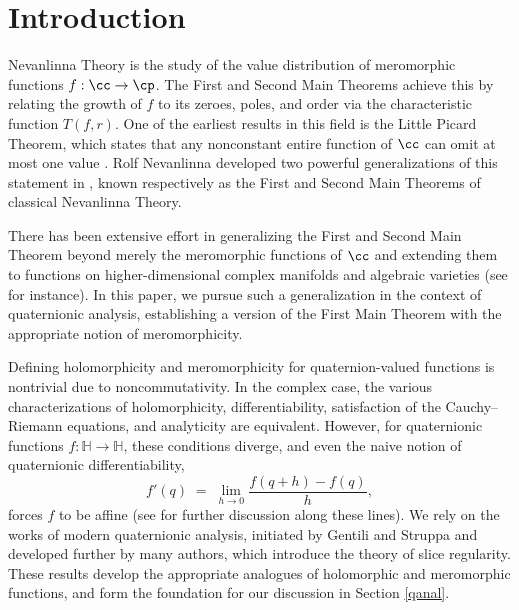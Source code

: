 \documentclass{amsart}
\begin{document}
\maketitle
\tableofcontents

\section{Introduction}

Nevanlinna Theory is the study of the value distribution of meromorphic functions $f:\cc\to\cp$. The First and Second Main Theorems achieve this by relating the growth of $f$ to its zeroes, poles, and order via the characteristic function $T(f,r)$. One of the earliest results in this field is the Little Picard Theorem, which states that any nonconstant entire function of $\cc$ can omit at most one value \cite{Picard1880}. Rolf Nevanlinna developed two powerful generalizations of this statement in \cite{Nevanlinna1925}, known respectively as the First and Second Main Theorems of classical Nevanlinna Theory.

There has been extensive effort in generalizing the First and Second Main Theorem beyond merely the meromorphic functions of $\cc$ and extending them to functions on higher-dimensional complex manifolds and algebraic varieties (see \cite{Bernard84, Griffiths1973, Noguchi2014, Quang2022} for instance). In this paper, we pursue such a generalization in the context of quaternionic analysis, establishing a version of the First Main Theorem with the appropriate notion of meromorphicity. 

Defining holomorphicity and meromorphicity for quaternion-valued functions is nontrivial due to noncommutativity. In the complex case, the various characterizations of holomorphicity, differentiability, satisfaction of the Cauchy--Riemann equations, and analyticity are equivalent. However, for quaternionic functions $f:\mathbb{H}\to\mathbb{H}$, these conditions diverge, and even the naive notion of quaternionic differentiability,
\[
f'(q) \;=\; \lim_{h\to 0} \frac{f(q+h)-f(q)}{h},
\]
forces $f$ to be affine (see \cite{sudbery1979} for further discussion along these lines). We rely on the works of modern quaternionic analysis, initiated by Gentili and Struppa \cite{GENTILI2007279} and developed further by many authors, which introduce the theory of slice regularity. These results develop the appropriate analogues of holomorphic and meromorphic functions, and form the foundation for our discussion in Section \ref{qanal}.
\end{document}
